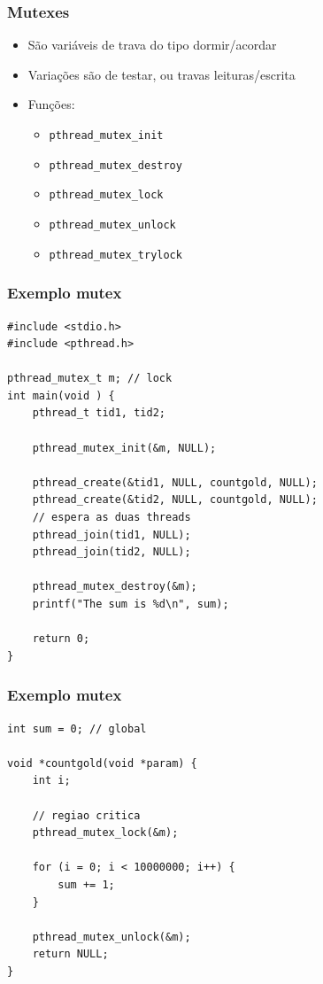 \documentclass[xcolor=dvipsnames,11pt,presentation,aspectratio=169]{beamer}
\begin{document}
\begin{frame}
  \frametitle{Mutexes}
  \begin{itemize}
  \item São variáveis de trava do tipo dormir/acordar
  \item Variações são de testar, ou travas leituras/escrita
  \item Funções:
    \begin{itemize}
      \item \texttt{pthread\_mutex\_init}
      \item \texttt{pthread\_mutex\_destroy}
      \item \texttt{pthread\_mutex\_lock}
      \item \texttt{pthread\_mutex\_unlock}
      \item \texttt{pthread\_mutex\_trylock}
    \end{itemize}
  \end{itemize}
\end{frame}
\begin{frame}[fragile]
  \frametitle{Exemplo mutex}
  \vspace{-5mm}
\begin{lstlisting}
#include <stdio.h>
#include <pthread.h>

pthread_mutex_t m; // lock
int main(void ) {
    pthread_t tid1, tid2;
    
    pthread_mutex_init(&m, NULL);

    pthread_create(&tid1, NULL, countgold, NULL);
    pthread_create(&tid2, NULL, countgold, NULL);
    // espera as duas threads
    pthread_join(tid1, NULL);
    pthread_join(tid2, NULL);

    pthread_mutex_destroy(&m);
    printf("The sum is %d\n", sum);

    return 0;
}
\end{lstlisting}
\end{frame}
\begin{frame}[fragile]
  \frametitle{Exemplo mutex}
\begin{lstlisting}
int sum = 0; // global

void *countgold(void *param) {
    int i;

    // regiao critica
    pthread_mutex_lock(&m);

    for (i = 0; i < 10000000; i++) {
	    sum += 1;
    }
      
    pthread_mutex_unlock(&m);
    return NULL;
}
\end{lstlisting}
\end{frame}
\end{document}

